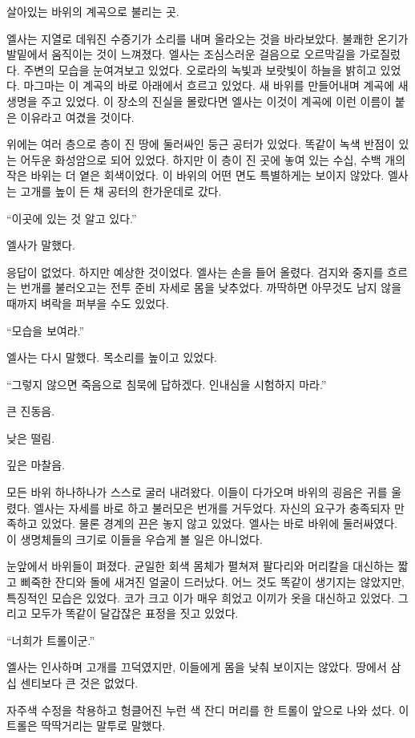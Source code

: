 \textbreak

살아있는 바위의 계곡으로 불리는 곳.

엘사는 지열로 데워진 수증기가 소리를 내며 올라오는 것을 바라보았다. 불쾌한 온기가 발밑에서 움직이는 것이 느껴졌다. 엘사는 조심스러운 걸음으로 오르막길을 가로질렀다. 주변의 모습을 눈여겨보고 있었다. 오로라의 녹빛과 보랏빛이 하늘을 밝히고 있었다. 마그마는 이 계곡의 바로 아래에서 흐르고 있었다. 새 바위를 만들어내며 계곡에 새 생명을 주고 있었다. 이 장소의 진실을 몰랐다면 엘사는 이것이 계곡에 이런 이름이 붙은 이유라고 여겼을 것이다.

위에는 여러 층으로 층이 진 땅에 둘러싸인 둥근 공터가 있었다. 똑같이 녹색 반점이 있는 어두운 화성암으로 되어 있었다. 하지만 이 층이 진 곳에 놓여 있는 수십, 수백 개의 작은 바위는 더 옅은 회색이었다. 이 바위의 어떤 면도 특별하게는 보이지 않았다. 엘사는 고개를 높이 든 채 공터의 한가운데로 갔다.

``이곳에 있는 것 알고 있다.''

엘사가 말했다.

응답이 없었다. 하지만 예상한 것이었다. 엘사는 손을 들어 올렸다. 검지와 중지를 흐르는 번개를 불러오고는 전투 준비 자세로 몸을 낮추었다. 까딱하면 아무것도 남지 않을 때까지 벼락을 퍼부을 수도 있었다.

``모습을 보여라.''

엘사는 다시 말했다. 목소리를 높이고 있었다.

``그렇지 않으면 죽음으로 침묵에 답하겠다. 인내심을 시험하지 마라.''

큰 진동음.

낮은 떨림.

깊은 마찰음.

모든 바위 하나하나가 스스로 굴러 내려왔다. 이들이 다가오며 바위의 굉음은 귀를 울렸다. 엘사는 자세를 바로 하고 불러모은 번개를 거두었다. 자신의 요구가 충족되자 만족하고 있었다. 물론 경계의 끈은 놓지 않고 있었다. 엘사는 바로 바위에 둘러싸였다. 이 생명체들의 크기로 이들을 우습게 볼 일은 아니었다.

눈앞에서 바위들이 펴졌다. 균일한 회색 몸체가 펼쳐져 팔다리와 머리칼을 대신하는 짧고 삐죽한 잔디와 돌에 새겨진 얼굴이 드러났다. 어느 것도 똑같이 생기지는 않았지만, 특징적인 모습은 있었다. 코가 크고 이가 매우 희었고 이끼가 옷을 대신하고 있었다. 그리고 모두가 똑같이 달갑잖은 표정을 짓고 있었다.

``너희가 트롤이군.''

엘사는 인사하며 고개를 끄덕였지만, 이들에게 몸을 낮춰 보이지는 않았다. 땅에서 삼십 센티보다 큰 것은 없었다.

자주색 수정을 착용하고 헝클어진 누런 색 잔디 머리를 한 트롤이 앞으로 나와 섰다. 이 트롤은 딱딱거리는 말투로 말했다.

